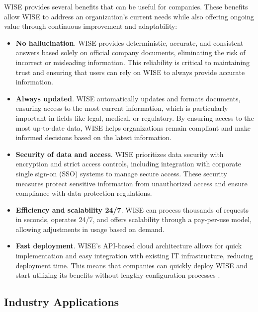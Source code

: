 WISE provides several benefits that can be useful for companies. These benefits allow WISE to address an organization’s current needs while also offering ongoing value through continuous improvement and adaptability:

\begin{itemize}
    \item \textbf{No hallucination}. WISE provides deterministic, accurate, and consistent answers based solely on official company documents, eliminating the risk of incorrect or misleading information. This reliability is critical to maintaining trust and ensuring that users can rely on WISE to always provide accurate information.
    
    \item \textbf{Always updated}. WISE automatically updates and formats documents, ensuring access to the most current information, which is particularly important in fields like legal, medical, or regulatory. By ensuring access to the most up-to-date data, WISE helps organizations remain compliant and make informed decisions based on the latest information.

    \item \textbf{Security of data and access}. WISE prioritizes data security with encryption and strict access controls, including integration with corporate single sign-on (SSO) systems to manage secure access. These security measures protect sensitive information from unauthorized access and ensure compliance with data protection regulations.

    \item \textbf{Efficiency and scalability 24/7}. WISE can process thousands of requests in seconds, operates 24/7, and offers scalability through a pay-per-use model, allowing adjustments in usage based on demand.

    \item \textbf{Fast deployment}. WISE's API-based cloud architecture allows for quick implementation and easy integration with existing IT infrastructure, reducing deployment time. This means that companies can quickly deploy WISE and start utilizing its benefits without lengthy configuration processes \cite{hpa2024}.
\end{itemize}


\subsection{Industry Applications}

